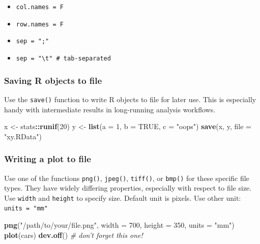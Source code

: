 \documentclass[]{book}
\newenvironment{Shaded}{\begin{snugshade}}{\end{snugshade}}
\newcommand{\CommentTok}[1]{\textcolor[rgb]{0.56,0.35,0.01}{\textit{#1}}}
\newcommand{\DataTypeTok}[1]{\textcolor[rgb]{0.13,0.29,0.53}{#1}}
\newcommand{\DecValTok}[1]{\textcolor[rgb]{0.00,0.00,0.81}{#1}}
\newcommand{\KeywordTok}[1]{\textcolor[rgb]{0.13,0.29,0.53}{\textbf{#1}}}
\newcommand{\NormalTok}[1]{#1}
\newcommand{\OperatorTok}[1]{\textcolor[rgb]{0.81,0.36,0.00}{\textbf{#1}}}
\newcommand{\OtherTok}[1]{\textcolor[rgb]{0.56,0.35,0.01}{#1}}
\newcommand{\StringTok}[1]{\textcolor[rgb]{0.31,0.60,0.02}{#1}}
\providecommand{\tightlist}{%
  \setlength{\itemsep}{0pt}\setlength{\parskip}{0pt}}
\begin{document}
\begin{itemize}
\tightlist
\item
  \texttt{col.names\ =\ F}
\item
  \texttt{row.names\ =\ F}
\item
  \texttt{sep\ =\ ";"}
\item
  \texttt{sep\ =\ "\textbackslash{}t"\ \#\ tab-separated}
\end{itemize}

\hypertarget{saving-r-objects-to-file}{%
\subsubsection*{Saving R objects to file}\label{saving-r-objects-to-file}}

Use the \texttt{save()} function to write R objects to file for later use.
This is especially handy with intermediate results in long-running analysis workflows.

\begin{Shaded}
\begin{Highlighting}[]
\NormalTok{x <-}\StringTok{ }\NormalTok{stats}\OperatorTok{::}\KeywordTok{runif}\NormalTok{(}\DecValTok{20}\NormalTok{)}
\NormalTok{y <-}\StringTok{ }\KeywordTok{list}\NormalTok{(}\DataTypeTok{a =} \DecValTok{1}\NormalTok{, }\DataTypeTok{b =} \OtherTok{TRUE}\NormalTok{, }\DataTypeTok{c =} \StringTok{"oops"}\NormalTok{)}
\KeywordTok{save}\NormalTok{(x, y, }\DataTypeTok{file =} \StringTok{"xy.RData"}\NormalTok{)}
\end{Highlighting}
\end{Shaded}

\hypertarget{writing-a-plot-to-file}{%
\subsubsection*{Writing a plot to file}\label{writing-a-plot-to-file}}

Use one of the functions \texttt{png()}, \texttt{jpeg()}, \texttt{tiff()}, or \texttt{bmp()} for these specific file types. They have widely differing properties, especially with respect to file size.\\
Use \texttt{width} and \texttt{height} to specify size. Default unit is pixels. Use other unit: \texttt{units\ =\ "mm"}

\begin{Shaded}
\begin{Highlighting}[]
\KeywordTok{png}\NormalTok{(}\StringTok{"/path/to/your/file.png"}\NormalTok{,}
    \DataTypeTok{width =} \DecValTok{700}\NormalTok{, }\DataTypeTok{height =} \DecValTok{350}\NormalTok{, }\DataTypeTok{units =} \StringTok{"mm"}\NormalTok{)}
\KeywordTok{plot}\NormalTok{(cars)}
\KeywordTok{dev.off}\NormalTok{() }\CommentTok{# don't forget this one!}
\end{Highlighting}
\end{Shaded}
\end{document}
